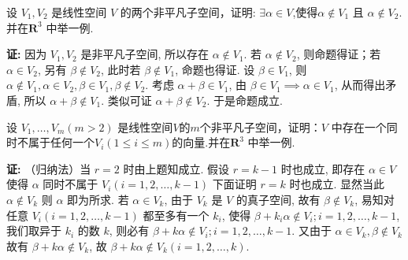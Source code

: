 \begin{exercise}
\begin{exgroup}
        \item 设 $V_1,V_2$ 是线性空间 $V$ 的两个非平凡子空间，证明: $\exists \alpha \in V$,使得$\alpha \notin V_1$ 且 $\alpha \notin V_2$.并在$\mathbf{R}^3$ 中举一例.
        \begin{answer}
            \textbf{证:} 因为 $V_1, V_2$ 是非平凡子空间, 所以存在 $\alpha \notin V_1$. 若 $\alpha \notin V_2$, 则命题得证；若 $\alpha \in V_2$, 另有 $\beta \notin V_2$, 此时若 $\beta \notin V_1$, 命题也得证. 设 $\beta \in V_1$, 则 $\alpha \notin V_1, \alpha \in V_2, \beta \in V_1, \beta \notin V_2$.
            考虑 $\alpha + \beta \in V_1$, 由 $\beta \in V_1 \implies \alpha \in V_1$, 从而得出矛盾, 所以 $\alpha + \beta \notin V_1$. 类似可证 $\alpha + \beta \notin V_2$. 于是命题成立.
        \end{answer}
        \item 设 $V_1,\ldots,V_m (m > 2)$ 是线性空间$V$的$m$个非平凡子空间，证明：$V$ 中存在一个同时不属于任何一个$V_i(1 \leqslant i \leqslant m)$的向量.并在$\mathbf{R}^3$ 中举一例.
        \begin{answer}\label{eg:4:A:5}
          \textbf{证:} （归纳法）当 $r=2$ 时由上题知成立.
          假设 $r = k-1$ 时也成立, 即存在 $\alpha \in V$
          使得 $\alpha$ 同时不属于 $V_i (i=1,2,\ldots,k-1)$
          下面证明 $r=k$ 时也成立. 显然当此 $\alpha \notin V_k$ 则 $\alpha$ 即为所求.
           若 $\alpha \in V_k$, 由于 $V_k$ 是 $V$ 的真子空间, 故有 $\beta \notin V_k$, 易知对任意 $V_i (i=1,2,\ldots,k-1)$ 都至多有一个 $k_i$, 使得 $\beta + k_i \alpha \notin V_i; i=1,2,\ldots,k-1$, 我们取异于 $k_i$ 的数 $k$, 则必有 $\beta + k \alpha \notin V_i; i=1,2,\ldots,k-1$. 又由于 $\alpha \in V_k, \beta \notin V_k$ 故有 $\beta + k \alpha \notin V_k$, 故 $\beta + k \alpha \notin V_k (i = 1,2,\dots,k)$.
        \end{answer}
    \end{exgroup}


\end{exercise}
